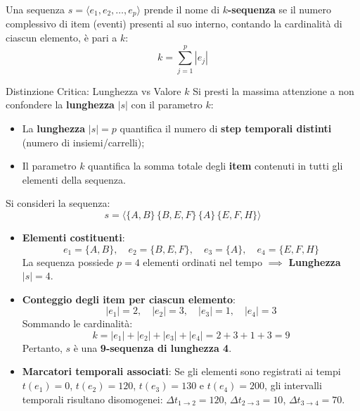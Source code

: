 \begin{definition}[$k$-Sequenza]
Una sequenza $s = \langle e_1, e_2, \dots, e_p \rangle$ prende il nome di \textbf{$k$-sequenza} se il numero complessivo di item (eventi) presenti al suo interno, contando la cardinalità di ciascun elemento, è pari a $k$:
\begin{equation}
\label{eq:seq-k-sequence}
k = \sum_{j=1}^{p} |e_j|
\end{equation}
\end{definition}

\begin{alertblock}{Distinzione Critica: Lunghezza vs Valore $k$}
    Si presti la massima attenzione a non confondere la \textbf{lunghezza} $|s|$ con il parametro \textbf{$k$}:
    \begin{itemize}[noitemsep]
        \item La \textbf{lunghezza} $|s| = p$ quantifica il numero di \textbf{step temporali distinti} (numero di insiemi/carrelli);
        \item Il parametro \textbf{$k$} quantifica la somma totale degli \textbf{item} contenuti in tutti gli elementi della sequenza.
    \end{itemize}
\end{alertblock}

\begin{example}
Si consideri la sequenza:
\begin{equation}
\label{eq:seq-example-calc}
s = \langle \{A, B\} \, \{B, E, F\} \, \{A\} \, \{E, F, H\} \rangle
\end{equation}
\begin{itemize}
    \item \textbf{Elementi costituenti}:
    \begin{equation*}
    e_1 = \{A, B\}, \quad e_2 = \{B, E, F\}, \quad e_3 = \{A\}, \quad e_4 = \{E, F, H\}
    \end{equation*}
    La sequenza possiede $p = 4$ elementi ordinati nel tempo $\implies$ \textbf{Lunghezza} $|s| = 4$.
    \item \textbf{Conteggio degli item per ciascun elemento}:
    \begin{equation*}
    |e_1| = 2, \quad |e_2| = 3, \quad |e_3| = 1, \quad |e_4| = 3
    \end{equation*}
    Sommando le cardinalità:
    \begin{equation*}
    k = |e_1| + |e_2| + |e_3| + |e_4| = 2 + 3 + 1 + 3 = 9
    \end{equation*}
    Pertanto, $s$ è una \textbf{9-sequenza di lunghezza 4}.
    \item \textbf{Marcatori temporali associati}:
    Se gli elementi sono registrati ai tempi $t(e_1) = 0$, $t(e_2) = 120$, $t(e_3) = 130$ e $t(e_4) = 200$, gli intervalli temporali risultano disomogenei: $\Delta t_{1 \to 2} = 120$, $\Delta t_{2 \to 3} = 10$, $\Delta t_{3 \to 4} = 70$.
\end{itemize}
\end{example}

